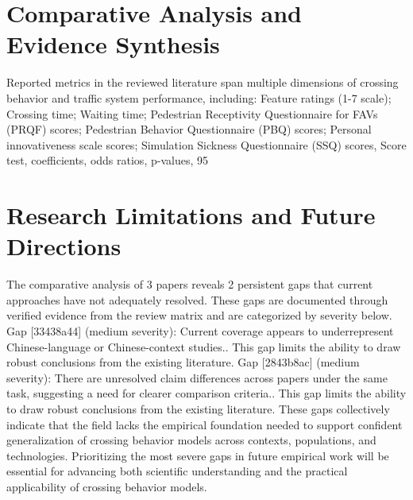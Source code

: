 \documentclass{article}
\begin{document}
\section{Comparative Analysis and Evidence Synthesis}
Reported metrics in the reviewed literature span multiple dimensions of crossing behavior and traffic system performance, including: Feature ratings (1-7 scale); Crossing time; Waiting time; Pedestrian Receptivity Questionnaire for FAVs (PRQF) scores; Pedestrian Behavior Questionnaire (PBQ) scores; Personal innovativeness scale scores; Simulation Sickness Questionnaire (SSQ) scores, Score test, coefficients, odds ratios, p-values, 95%

\section{Research Limitations and Future Directions}
The comparative analysis of 3 papers reveals 2 persistent gaps that current approaches have not adequately resolved. These gaps are documented through verified evidence from the review matrix and are categorized by severity below. Gap [33438a44] (medium severity): Current coverage appears to underrepresent Chinese-language or Chinese-context studies.. This gap limits the ability to draw robust conclusions from the existing literature. Gap [2843b8ac] (medium severity): There are unresolved claim differences across papers under the same task, suggesting a need for clearer comparison criteria.. This gap limits the ability to draw robust conclusions from the existing literature. These gaps collectively indicate that the field lacks the empirical foundation needed to support confident generalization of crossing behavior models across contexts, populations, and technologies. Prioritizing the most severe gaps in future empirical work will be essential for advancing both scientific understanding and the practical applicability of crossing behavior models.
\end{document}
